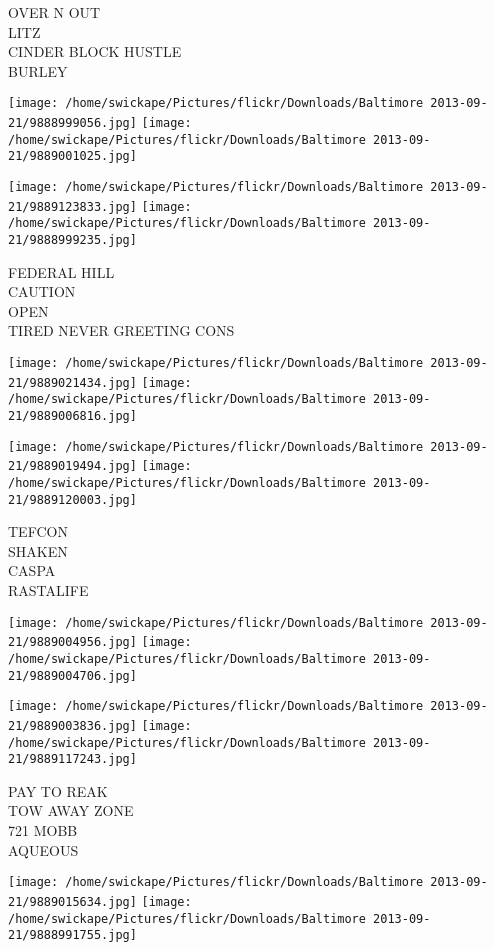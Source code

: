 \documentclass[10pt,letterpaper]{article}
\begin{document}
OVER N OUT\\
LITZ\\
CINDER BLOCK HUSTLE\\
BURLEY
\pagebreak

\texttt{[image: /home/swickape/Pictures/flickr/Downloads/Baltimore 2013-09-21/9888999056.jpg]}
\texttt{[image: /home/swickape/Pictures/flickr/Downloads/Baltimore 2013-09-21/9889001025.jpg]}

\texttt{[image: /home/swickape/Pictures/flickr/Downloads/Baltimore 2013-09-21/9889123833.jpg]}
\texttt{[image: /home/swickape/Pictures/flickr/Downloads/Baltimore 2013-09-21/9888999235.jpg]}

FEDERAL HILL\\
CAUTION\\
OPEN\\
TIRED NEVER GREETING CONS
\pagebreak

\texttt{[image: /home/swickape/Pictures/flickr/Downloads/Baltimore 2013-09-21/9889021434.jpg]}
\texttt{[image: /home/swickape/Pictures/flickr/Downloads/Baltimore 2013-09-21/9889006816.jpg]}

\texttt{[image: /home/swickape/Pictures/flickr/Downloads/Baltimore 2013-09-21/9889019494.jpg]}
\texttt{[image: /home/swickape/Pictures/flickr/Downloads/Baltimore 2013-09-21/9889120003.jpg]}

TEFCON\\
SHAKEN\\
CASPA\\
RASTALIFE
\pagebreak

\texttt{[image: /home/swickape/Pictures/flickr/Downloads/Baltimore 2013-09-21/9889004956.jpg]}
\texttt{[image: /home/swickape/Pictures/flickr/Downloads/Baltimore 2013-09-21/9889004706.jpg]}

\texttt{[image: /home/swickape/Pictures/flickr/Downloads/Baltimore 2013-09-21/9889003836.jpg]}
\texttt{[image: /home/swickape/Pictures/flickr/Downloads/Baltimore 2013-09-21/9889117243.jpg]}

PAY TO REAK\\
TOW AWAY ZONE\\
721 MOBB\\
AQUEOUS
\pagebreak

\texttt{[image: /home/swickape/Pictures/flickr/Downloads/Baltimore 2013-09-21/9889015634.jpg]}
\texttt{[image: /home/swickape/Pictures/flickr/Downloads/Baltimore 2013-09-21/9888991755.jpg]}
\end{document}
